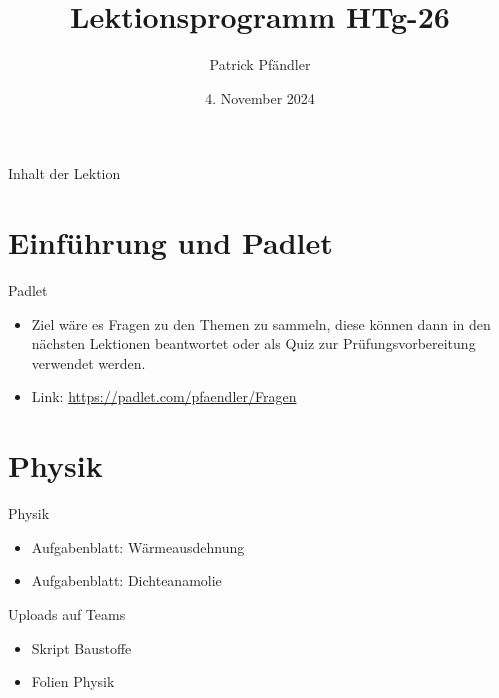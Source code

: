 



\title{\textbf{Lektionsprogramm HTg-26}}
\author{Patrick Pfändler}
\date{4. November 2024}




\frame{\titlepage}

\begin{frame}{Inhalt der Lektion}
    \tableofcontents
\end{frame}


\section{Einführung und Padlet}

\begin{frame}{Padlet}
\begin{itemize}
	\item[\textbullet] Ziel wäre es Fragen zu den Themen zu sammeln, diese können dann in den nächsten Lektionen beantwortet oder als Quiz zur Prüfungsvorbereitung verwendet werden.
	\item[\textbullet] Link: \url{https://padlet.com/pfaendler/Fragen}
\end{itemize}
\end{frame}

\section{Physik}
\begin{frame}{Physik}
	\begin{itemize}
		\item[\textbullet] Aufgabenblatt:	Wärmeausdehnung
		\item[\textbullet] Aufgabenblatt:	Dichteanamolie
	\end{itemize}
\end{frame}


\begin{frame}{Uploads auf Teams}
    \begin{itemize}
        \item [\textbullet] Skript Baustoffe
        \item[\textbullet]  Folien Physik
    \end{itemize}
\end{frame}

\folieFragen

